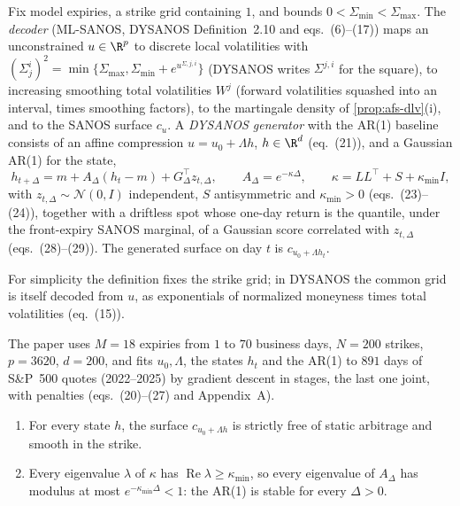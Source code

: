 \begin{definition}\label{def:afs-dysanos}
Fix model expiries, a strike grid containing $1$, and bounds $0<\Sigma_{\min}<\Sigma_{\max}$. The \emph{decoder} (ML-SANOS, DYSANOS Definition~2.10 and
eqs.~(6)--(17)) maps an unconstrained $u\in\R^p$ to discrete local volatilities with
$(\Sigma_j^i)^2=\min\{\Sigma_{\max},\Sigma_{\min}+e^{u^{\Sigma,j,i}}\}$ (DYSANOS writes $\Sigma^{j,i}$ for the square), to increasing smoothing total volatilities $W^j$ (forward volatilities
squashed into an interval, times smoothing factors), to the martingale density of \cref{prop:afs-dlv}(i), and to the SANOS surface
$c_u$. A \emph{DYSANOS generator} with the AR(1) baseline consists of an affine compression $u=u_0+\Lambda h$, $h\in\R^d$ (eq.~(21)), and
a Gaussian AR(1) for the state,
\[
  h_{t+\Delta}=m+A_\Delta(h_t-m)+G_\Delta^\top z_{t,\Delta},\qquad A_\Delta=e^{-\kappa\Delta},\qquad\kappa=LL^\top+S+\kappa_{\min}I,
\]
with $z_{t,\Delta}\sim\mathcal N(0,I)$ independent, $S$ antisymmetric and $\kappa_{\min}>0$ (eqs.~(23)--(24)), together with a driftless spot whose
one-day return is the quantile, under the front-expiry SANOS marginal, of a Gaussian score correlated with $z_{t,\Delta}$
(eqs.~(28)--(29)). The generated surface on day $t$ is $c_{u_0+\Lambda h_t}$.
\end{definition}

For simplicity the definition fixes the strike grid; in DYSANOS the common grid is itself decoded from $u$, as exponentials of
normalized moneyness times total volatilities (eq.~(15)).

The paper uses $M=18$ expiries from $1$ to $70$ business days, $N=200$ strikes, $p=3620$, $d=200$, and fits $u_0,\Lambda$, the states $h_t$
and the AR(1) to $891$ days of S\&P~500 quotes (2022--2025) by gradient descent in stages, the last one joint, with penalties
(eqs.~(20)--(27) and Appendix~A).

\begin{proposition}\label{prop:afs-generator}
\begin{enumerate}[label=(\roman*)]
  \item For every state $h$, the surface $c_{u_0+\Lambda h}$ is strictly free of static arbitrage and smooth in the strike.
  \item Every eigenvalue $\lambda$ of $\kappa$ has $\operatorname{Re}\lambda\ge\kappa_{\min}$, so every eigenvalue of $A_\Delta$ has modulus at most
    $e^{-\kappa_{\min}\Delta}<1$: the AR(1) is stable for every $\Delta>0$.
\end{enumerate}
\end{proposition}

